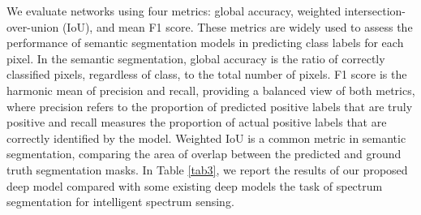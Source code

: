 \documentclass[conference]{IEEEtran} %
\begin{document}
We evaluate networks using four metrics: global accuracy, weighted intersection-over-union (IoU), and mean F1 score. These metrics are widely used to assess the performance of semantic segmentation models in predicting class labels for each pixel. In the semantic segmentation, global accuracy is the ratio of correctly classified pixels, regardless of class, to the total number of pixels. F1 score is the harmonic mean of precision and recall, providing a balanced view of both metrics, where precision refers to the proportion of predicted positive labels that are truly positive and recall measures the proportion of actual positive labels that are correctly identified by the model. Weighted IoU is a common metric in semantic segmentation, comparing the area of overlap between the predicted and ground truth segmentation masks. In Table \ref{tab3}, we report the results of our proposed deep model compared with some existing deep models the task of spectrum segmentation for intelligent spectrum sensing. 
\end{document}
